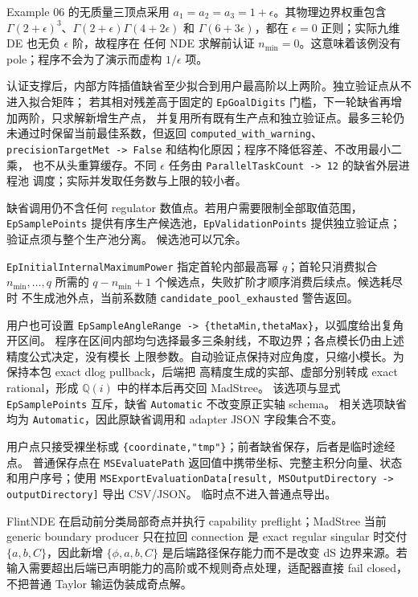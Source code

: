 \documentclass[11pt,a4paper]{ctexart}
\begin{document}
Example 06 的无质量三顶点采用
$a_1=a_2=a_3=1+\epsilon$。其物理边界权重包含
$\Gamma(2+\epsilon)^3$、$\Gamma(2+\epsilon)\Gamma(4+2\epsilon)$ 和
$\Gamma(6+3\epsilon)$，都在 $\epsilon=0$ 正则；实际九维 DE 也无负 $\epsilon$ 阶，故程序在
任何 NDE 求解前认证 $n_{\min}=0$。这意味着该例没有 pole；程序不会为了演示而虚构
$1/\epsilon$ 项。

认证支撑后，内部方阵插值缺省至少拟合到用户最高阶以上两阶。独立验证点从不进入拟合矩阵；
若其相对残差高于固定的 \texttt{EpGoalDigits} 门槛，下一轮缺省再增加两阶，只求解新增生产点，
并复用所有既有生产点和独立验证点。最多三轮仍未通过时保留当前最佳系数，但返回
\texttt{computed\_with\_warning}、\texttt{precisionTargetMet -> False} 和结构化原因；程序不降低容差、不改用最小二乘，
也不从头重算缓存。不同 $\epsilon$ 任务由 \texttt{ParallelTaskCount -> 12} 的缺省外层进程池
调度；实际并发取任务数与上限的较小者。

缺省调用仍不含任何 regulator 数值点。若用户需要限制全部取值范围，
\texttt{EpSamplePoints} 提供有序生产候选池，\texttt{EpValidationPoints} 提供独立验证点；
验证点须与整个生产池分离。
候选池可以冗余。

\texttt{EpInitialInternalMaximumPower} 指定首轮内部最高幂 $q$；首轮只消费拟合
$n_{\min},\ldots,q$ 所需的 $q-n_{\min}+1$ 个候选点，失败扩阶才顺序消费后续点。候选耗尽时
不生成池外点，当前系数随 \texttt{candidate\_pool\_exhausted} 警告返回。

用户也可设置 \texttt{EpSampleAngleRange -> \{thetaMin,thetaMax\}}，以弧度给出复角开区间。
程序在区间内部均匀选择最多三条射线，不取边界；各点模长仍由上述精度公式决定，没有模长
上限参数。自动验证点保持对应角度，只缩小模长。为保持本包 exact dlog pullback，后端把
高精度生成的实部、虚部分别转成 exact rational，形成 $\mathbb Q(i)$ 中的样本后再交回 MadStree。
该选项与显式 \texttt{EpSamplePoints} 互斥，缺省 \texttt{Automatic} 不改变原正实轴 schema。
相关选项缺省均为 \texttt{Automatic}，因此原缺省调用和 adapter JSON 字段集合不变。

用户点只接受裸坐标或 \texttt{\{coordinate,}\allowbreak\texttt{"tmp"\}}；前者缺省保存，后者是临时途经点。
普通保存点在 \texttt{MSEvaluatePath} 返回值中携带坐标、完整主积分向量、状态和用户序号；使用
\texttt{MSExportEvaluationData[result,}\allowbreak\texttt{ MSOutputDirectory -> outputDirectory]} 导出 CSV/JSON。
临时点不进入普通点导出。

FlintNDE 在启动前分类局部奇点并执行 capability preflight；MadStree 当前 generic boundary producer 只在拉回 connection 是 exact regular singular 时交付 $\{a,b,C\}$，因此新增 $\{\phi,a,b,C\}$ 是后端路径保存能力而不是改变 dS 边界来源。若输入需要超出后端已声明能力的高阶或不规则奇点处理，适配器直接 fail closed，不把普通 Taylor 输运伪装成奇点解。
\end{document}
